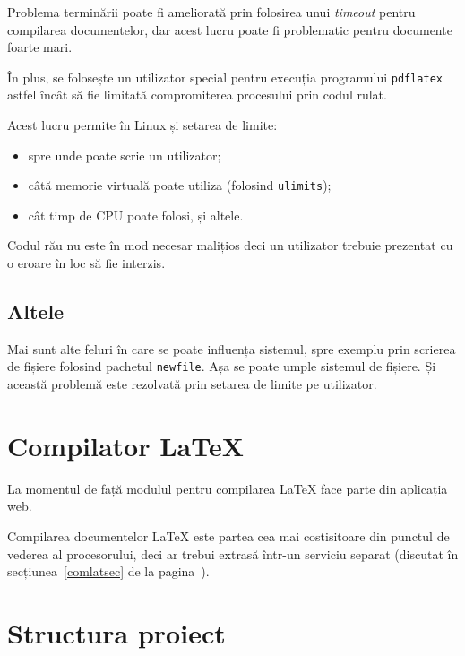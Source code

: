 \documentclass[a4wide,12pt]{report}
\newcommand{\eng}[1]{\emph{#1}} %
\newcommand{\cod}[1]{\texttt{#1}}
\begin{document}
Problema terminării poate fi ameliorată prin folosirea unui \eng{timeout} pentru
compilarea documentelor, dar acest lucru poate fi problematic pentru documente
foarte mari.

În plus, se folosește un utilizator special pentru execuția programului
\cod{pdflatex} astfel încât să fie limitată compromiterea procesului prin codul
rulat.

Acest lucru permite în Linux și setarea de limite:

\begin{itemize}

\item spre unde poate scrie un utilizator;

\item câtă memorie virtuală poate utiliza (folosind \cod{ulimits});

\item cât timp de CPU poate folosi, și altele.

\end{itemize}

Codul rău nu este în mod necesar malițios deci un utilizator trebuie prezentat
cu o eroare în loc să fie interzis.

\subsection{Altele}

Mai sunt alte feluri în care se poate influența sistemul, spre exemplu prin
scrierea de fișiere folosind pachetul \cod{newfile}. Așa se poate umple sistemul
de fișiere. Și această problemă este rezolvată prin setarea de limite pe
utilizator.

\section{Compilator \LaTeX}

La momentul de față modulul pentru compilarea \LaTeX{} face parte din aplicația
web.

Compilarea documentelor \LaTeX{} este partea cea mai costisitoare din punctul de
vederea al procesorului, deci ar trebui extrasă într-un serviciu separat
(discutat în secțiunea~\ref{comlatsec} de la pagina~\pageref{comlatsec}).

\section{Structura proiect}
\end{document}
